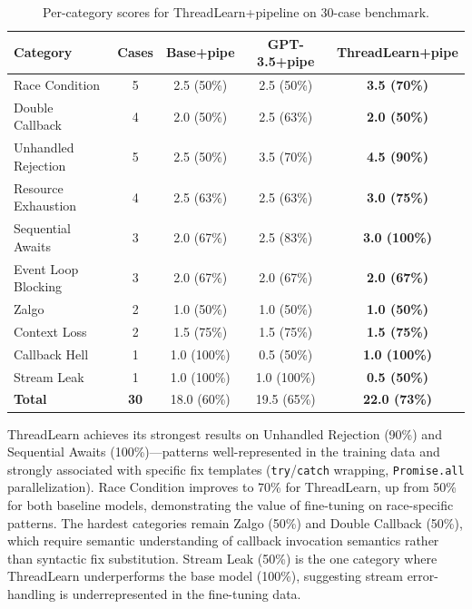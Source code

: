 \documentclass[runningheads]{llncs}
\begin{document}
\begin{table}[H]
  \centering
  \caption{Per-category scores for ThreadLearn+pipeline on 30-case benchmark.}
  \label{tab:category}
  \begin{tabular}{@{}lcccc@{}}
    \toprule
    \textbf{Category} & \textbf{Cases} & \textbf{Base+pipe} & \textbf{GPT-3.5+pipe}
      & \textbf{ThreadLearn+pipe} \\
    \midrule
    Race Condition      & 5 & 2.5 (50\%) & 2.5 (50\%) & \textbf{3.5 (70\%)} \\
    Double Callback     & 4 & 2.0 (50\%) & 2.5 (63\%) & \textbf{2.0 (50\%)} \\
    Unhandled Rejection & 5 & 2.5 (50\%) & 3.5 (70\%) & \textbf{4.5 (90\%)} \\
    Resource Exhaustion & 4 & 2.5 (63\%) & 2.5 (63\%) & \textbf{3.0 (75\%)} \\
    Sequential Awaits   & 3 & 2.0 (67\%) & 2.5 (83\%) & \textbf{3.0 (100\%)} \\
    Event Loop Blocking & 3 & 2.0 (67\%) & 2.0 (67\%) & \textbf{2.0 (67\%)} \\
    Zalgo               & 2 & 1.0 (50\%) & 1.0 (50\%) & \textbf{1.0 (50\%)} \\
    Context Loss        & 2 & 1.5 (75\%) & 1.5 (75\%) & \textbf{1.5 (75\%)} \\
    Callback Hell       & 1 & 1.0 (100\%)& 0.5 (50\%) & \textbf{1.0 (100\%)} \\
    Stream Leak         & 1 & 1.0 (100\%)& 1.0 (100\%)& \textbf{0.5 (50\%)} \\
    \midrule
    \textbf{Total}      & \textbf{30} & 18.0 (60\%) & 19.5 (65\%)
      & \textbf{22.0 (73\%)} \\
    \bottomrule
  \end{tabular}
\end{table}

ThreadLearn achieves its strongest results on Unhandled Rejection (90\%)
and Sequential Awaits (100\%)---patterns well-represented in the training
data and strongly associated with specific fix templates
(\texttt{try}/\texttt{catch} wrapping, \texttt{Promise.all} parallelization).
Race Condition improves to 70\% for ThreadLearn, up from 50\% for both
baseline models, demonstrating the value of fine-tuning on race-specific
patterns.
The hardest categories remain Zalgo (50\%) and Double Callback (50\%),
which require semantic understanding of callback invocation semantics
rather than syntactic fix substitution.
Stream Leak (50\%) is the one category where ThreadLearn underperforms
the base model (100\%), suggesting stream error-handling is
underrepresented in the fine-tuning data.
\end{document}
